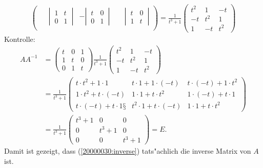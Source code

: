\begin{loesung}
\begin{align}
\begin{pmatrix}
\phantom{-}\left|\,\begin{matrix}1&t\\0&1\end{matrix}\,\right|
	&-\left|\,\begin{matrix}t&0\\0&1\end{matrix}\,\right|
		&\phantom{-}\left|\,\begin{matrix}t&0\\1&t\end{matrix}\,\right|\\
\end{pmatrix}
=\frac1{t^3+1}
\begin{pmatrix}
t^2&  1& -t\\
 -t&t^2&  1\\
  1& -t&t^2
\end{pmatrix}
\label{20000030:inverse}
\end{align}
Kontrolle:
\begin{align*}
AA^{-1}
&=
\begin{pmatrix}
t&0&1\\
1&t&0\\
0&1&t
\end{pmatrix}
\frac{1}{t^3+1}
\begin{pmatrix}
t^2&  1& -t\\
 -t&t^2&  1\\
  1& -t&t^2
\end{pmatrix}
\\
&=
\frac{1}{t^3+1}
\begin{pmatrix}
t\cdot t^2+1\cdot 1
	&t\cdot 1+1\cdot(-t)
		&t\cdot(-t)+1\cdot t^2\\
1\cdot t^2+t\cdot (-t)
	&1\cdot 1+t\cdot t^2
		&1\cdot(-t)+t\cdot 1\\
t\cdot (-t)+t\cdot 1§
	&t^2\cdot 1+t\cdot (-t)
		&1\cdot 1+t\cdot t^2
\end{pmatrix}
\\
&=
\frac1{t^3+1}
\begin{pmatrix}
t^3+1&    0&    0\\
    0&t^3+1&    0\\
    0&    0&t^3+1
\end{pmatrix}=E.
\end{align*}
Damit ist gezeigt, dass (\ref{20000030:inverse}) tats"achlich die inverse Matrix
von $A$ ist.
\end{loesung}
